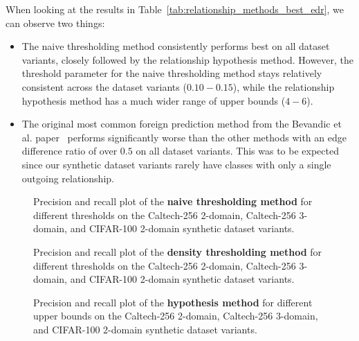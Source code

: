 When looking at the results in Table~\ref{tab:relationship_methods_best_edr},
we can observe two things:
\begin{itemize}
      \item The naive thresholding method consistently performs best on all dataset variants,
            closely followed by the relationship hypothesis method.
            However, the threshold parameter for the naive thresholding method
            stays relatively consistent across the dataset variants ($0.10 - 0.15$),
            while the relationship hypothesis method has a much wider range of upper bounds ($4 - 6$).
      \item The original most common foreign prediction method
            from the Bevandic et al. paper~\cite{bevandic_automatic_2022} performs significantly
            worse than the other methods with an edge difference ratio of over $0.5$ on all dataset variants.
            This was to be expected since our synthetic dataset variants rarely have
            classes with only a single outgoing relationship.
\end{itemize}

\begin{figure}[H]
      \centering
      \resizebox{0.6\textwidth}{!}{}
      \caption{Precision and recall plot of the \textbf{naive thresholding method}
            for different thresholds on the Caltech-256 2-domain, Caltech-256 3-domain, and CIFAR-100 2-domain synthetic dataset variants.}
      \label{fig:naive_thresholding_precision_recall}
\end{figure}

\begin{figure}[H]
      \centering
      \resizebox{0.6\textwidth}{!}{}
      \caption{Precision and recall plot of the \textbf{density thresholding method}
            for different thresholds on the Caltech-256 2-domain, Caltech-256 3-domain, and CIFAR-100 2-domain synthetic dataset variants.}
      \label{fig:density_thresholding_precision_recall}
\end{figure}

\begin{figure}[H]
      \centering
      \resizebox{0.6\textwidth}{!}{}
      \caption{Precision and recall plot of the \textbf{hypothesis method}
            for different upper bounds on the Caltech-256 2-domain, Caltech-256 3-domain, and CIFAR-100 2-domain synthetic dataset variants.}
      \label{fig:hypothesis_method_precision_recall}
\end{figure}

